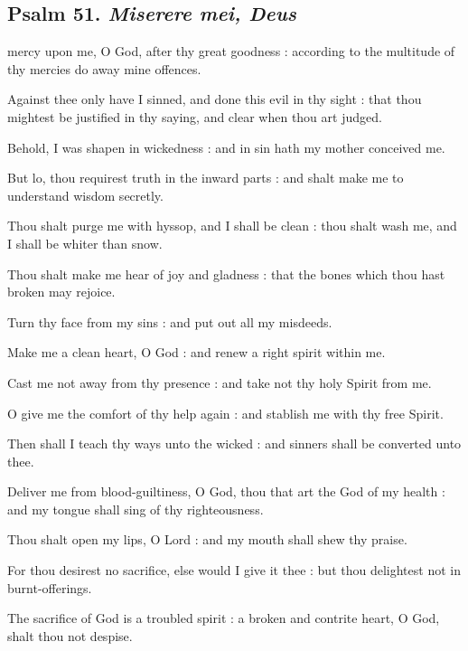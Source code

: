 \subsection{Psalm 51. \textit{Miserere mei, Deus}}
 mercy upon me, O God, after thy great goodness : according to the multitude of thy mercies do away mine offences.\par
{}
Against thee only have I sinned, and done this evil in thy sight : that thou mightest be justified in thy saying, and clear when thou art judged.\par
{}Behold, I was shapen in wickedness : and in sin hath my mother conceived me.\par
{}But lo, thou requirest truth in the inward parts : and shalt make me to understand wisdom secretly.\par
{}Thou shalt purge me with hyssop, and I shall be clean : thou shalt wash me, and I shall be whiter than snow.\par
{}Thou shalt make me hear of joy and gladness : that the bones which thou hast broken may rejoice.\par
{}Turn thy face from my sins : and put out all my misdeeds.\par
{}Make me a clean heart, O God : and renew a right spirit within me.\par
{}Cast me not away from thy presence : and take not thy holy Spirit from me.\par
{}O give me the comfort of thy help again : and stablish me with thy free Spirit.\par
{}Then shall I teach thy ways unto the wicked : and sinners shall be converted unto thee.\par
{}Deliver me from blood-guiltiness, O God, thou that art the God of my health : and my tongue shall sing of thy righteousness.\par
{}Thou shalt open my lips, O Lord : and my mouth shall shew thy praise.\par
{}For thou desirest no sacrifice, else would I give it thee : but thou delightest not in burnt-offerings.\par
{}The sacrifice of God is a troubled spirit : a broken and contrite heart, O God, shalt thou not despise.\par
